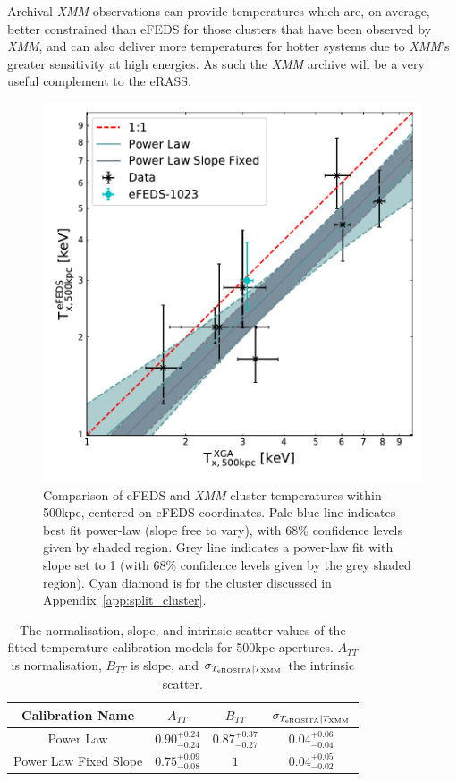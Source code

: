 \documentclass[fleqn,usenatbib]{mnras}
\begin{document}
Archival {\em XMM} observations can provide temperatures which are, on average, better constrained than eFEDS for those clusters that have been observed by {\em XMM}, and can also deliver more temperatures for hotter systems due to {\em XMM}'s greater sensitivity at high energies.  As such the {\em XMM} archive will be a very useful complement to the eRASS.


\begin{figure}
    \centering
    \includegraphics[width=0.95\columnwidth]{images/efeds_xcs_t500cal.pdf}
    \caption[]{Comparison of eFEDS and {\em XMM} cluster temperatures within 500kpc, centered on eFEDS coordinates. Pale blue line indicates best fit power-law (slope free to vary), with 68\% confidence levels given by shaded region. Grey line indicates a power-law fit with slope set to 1 (with 68\% confidence levels given by the grey shaded region). Cyan diamond is for the cluster discussed in Appendix~\ref{app:split_cluster}.}
    \label{fig:t500kpccomp}
\end{figure}


\begin{table}
\begin{center}
\caption[]{{\small The normalisation, slope, and intrinsic scatter values of the fitted temperature calibration models for 500kpc apertures. $A_{TT}$ is normalisation, $B_{TT}$ is slope, and $\sigma_{T_{\rm{eROSITA}}|T_{\rm{XMM}}}$ the intrinsic scatter.}\label{tab:tempcal}}
\vspace{1mm}
\begin{tabular}{cccc}
\hline
\hline
Calibration Name & $A_{TT}$ & $B_{TT}$ & $\sigma_{T_{\rm{eROSITA}}|T_{\rm{XMM}}}$\\
\hline
\hline
Power Law & $0.90^{+0.24}_{-0.24}$ & $0.87^{+0.37}_{-0.27}$ & $0.04^{+0.06}_{-0.04}$ \\
\hline
Power Law Fixed Slope & $0.75^{+0.09}_{-0.08}$ & $1$ & $0.04^{+0.05}_{-0.02}$ \\
\hline
\end{tabular}
\end{center}
\end{table}
\end{document}
